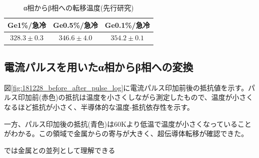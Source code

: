 \begin{table}[!h]
    \begin{center}
  \begin{tabular}{ccc}
    Ge1\%/急冷 & Ge0.5\%/急冷 & Ge0.1\%/急冷  \\ \hline
    $328.3\pm0.3$ & $346.6\pm4.0$ & $354.2\pm0.1$ \\
  \end{tabular}
  \caption{α相からβ相への転移温度(先行研究\cite{})}
  \label{tab:transT_ref}
    \end{center}
\end{table}

\subsection{電流パルスを用いたα相からβ相への変換}
図\ref{fig:181228_before_after_pulse_log}に電流パルス印加前後の抵抗値を示す。パルス印加前(赤色)の抵抗は温度を小さくしながら測定したもので、温度が小さくなるほど抵抗が小さく、半導体的な温度-抵抗依存性を示す。

一方、パルス印加後の抵抗(青色)は60Kより低温で温度が小さくなっていることがわかる。この領域で金属からの寄与が大きく、超伝導体転移が確認できた。

では金属との並列として理解できる\cite{Mayr,McLachlan}

